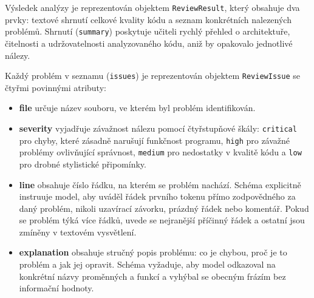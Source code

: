 Výsledek analýzy je reprezentován objektem \texttt{ReviewResult}, který obsahuje dva prvky: textové shrnutí celkové kvality kódu a seznam konkrétních nalezených problémů.
Shrnutí (\texttt{summary}) poskytuje učiteli rychlý přehled o architektuře, čitelnosti a udržovatelnosti analyzovaného kódu, aniž by opakovalo jednotlivé nálezy.

Každý problém v seznamu (\texttt{issues}) je reprezentován objektem \texttt{ReviewIssue} se čtyřmi povinnými atributy:

\begin{itemize}
    \item \textbf{file} určuje název souboru, ve kterém byl problém identifikován.

    \item \textbf{severity} vyjadřuje závažnost nálezu pomocí čtyřstupňové škály: \texttt{critical} pro chyby, které zásadně narušují funkčnost programu, \texttt{high} pro závažné problémy ovlivňující správnost, \texttt{medium} pro nedostatky v kvalitě kódu a \texttt{low} pro drobné stylistické připomínky.

    \item \textbf{line} obsahuje číslo řádku, na kterém se problém nachází.
    Schéma explicitně instruuje model, aby uváděl řádek prvního tokenu přímo zodpovědného za daný problém, nikoli uzavírací závorku, prázdný řádek nebo komentář.
    Pokud se problém týká více řádků, uvede se nejranější příčinný řádek a ostatní jsou zmíněny v textovém vysvětlení.

    \item \textbf{explanation} obsahuje stručný popis problému: co je chybou, proč je to problém a jak jej opravit.
    Schéma vyžaduje, aby model odkazoval na konkrétní názvy proměnných a funkcí a vyhýbal se obecným frázím bez informační hodnoty.
\end{itemize}

\endinput